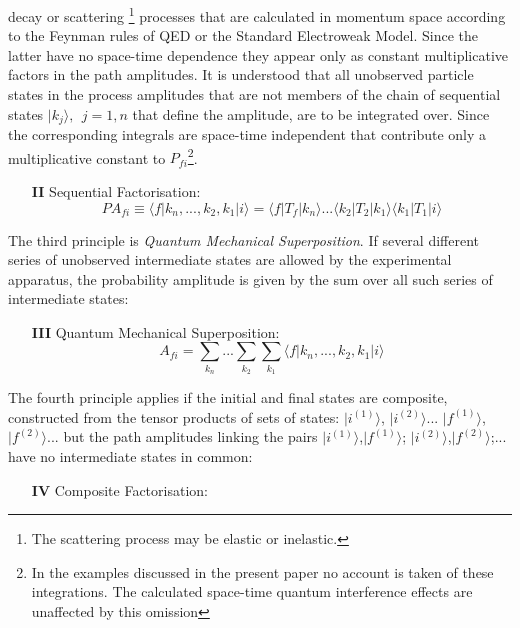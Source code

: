 {    decay or scattering \footnote{The scattering process may be elastic or inelastic.} processes
     that are calculated in momentum space according to the Feynman rules of QED or the
     Standard Electroweak Model. Since the latter have no space-time dependence they appear only
    as constant multiplicative factors in the path amplitudes. It is understood that all unobserved
    particle states in the process amplitudes that are not members of the chain
    of sequential states $|k_j\rangle,~~j=1,n$ that define the amplitude, are to be integrated over.
    Since the corresponding integrals are space-time independent that contribute only a 
    multiplicative constant to $P_{fi}$\footnote{In the examples discussed in the present 
   paper no account is taken of these integrations. The calculated space-time quantum interference
   effects are unaffected by this omission}.  
 \begin{itemize}
  \item[{\bf II}] Sequential Factorisation: 
   \begin{equation}
   PA_{fi} \equiv \langle f|k_n,...,k_2,k_1|i \rangle = \langle f |T_f|k_n\rangle...
    \langle k_2 |T_2|k_1\rangle \langle k_1 |T_1|i\rangle 
   \end{equation}
 \end{itemize}
    \par The third principle is {\it Quantum Mechanical Superposition}. If several different series of
    unobserved intermediate states are allowed by the experimental apparatus, the 
   probability amplitude is given
    by the sum over all such series of intermediate states:
 \begin{itemize}
  \item[{\bf III}]  Quantum Mechanical Superposition:
   \begin{equation}
    A_{fi} = \sum_{k_n}...\sum_{k_2}\sum_{k_1} \langle f|k_n,...,k_2,k_1|i \rangle
    \end{equation}
 \end{itemize} 
    \par The fourth principle applies if the initial and final states are composite,
  constructed from the tensor products of sets
 of states: $|i^{(1)}\rangle$, $|i^{(2)}\rangle$...
    $|f^{(1)}\rangle$, $|f^{(2)}\rangle$... but the path amplitudes linking the pairs 
    $|i^{(1)}\rangle$,$|f^{(1)}\rangle$; $|i^{(2)}\rangle$,$|f^{(2)}\rangle$;... have no intermediate
    states in common:
  \begin{itemize}
  \item[{\bf IV}]  Composite Factorisation:

\end{itemize}}

